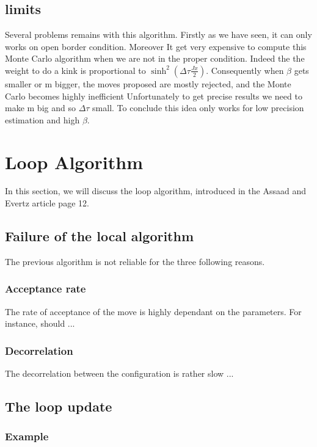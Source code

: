 \documentclass[a4paper,12pt,twoside]{article}
\begin{document}
	\subsection{limits}
	Several problems remains with this algorithm. Firstly as we have seen, it can only works on open border condition.
	Moreover It get very expensive to compute this Monte Carlo algorithm when we are not in the proper condition. Indeed the the weight to do a kink is proportional to $\sinh^2(\Delta\tau \frac{Jx}{2})$. Consequently when $\beta$ gets smaller or m bigger, the moves proposed are mostly rejected, and the Monte Carlo becomes highly inefficient 
	Unfortunately to get precise results we need to make m big and so $\Delta\tau$ small. 
	To conclude this idea only works for low precision estimation and high $\beta$.
	



	\section{Loop Algorithm}
	In this section, we will discuss the loop algorithm, introduced in the Assaad and Evertz article page 12. 
	
	\subsection{Failure of the local algorithm}
	The previous algorithm is not reliable for the three following reasons.
	


	\subsubsection{Acceptance rate} The rate of acceptance of the move is highly dependant on the parameters. For instance, should ...
	
	\subsubsection{Decorrelation} The decorrelation between the configuration is rather slow ...

	\subsection{The loop update}
	
	\subsubsection{Example}
	
\end{document}
